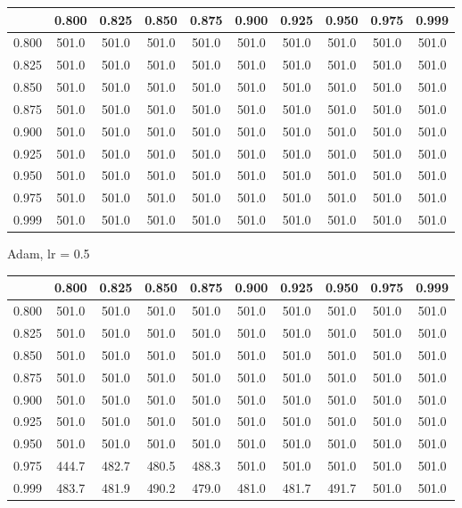 \documentclass[a4paper,14pt,oneside,openany]{memoir}
\begin{document}
	\begin{tabular}{|c|c|c|c|c|c|c|c|c|c|}
	\hline 
	 &0.800 &0.825 &0.850 &0.875 &0.900 &0.925 &0.950 &0.975 &0.999 \\
	 \hline 
	0.800 &501.0 &501.0 &501.0 &501.0 &501.0 &501.0 &501.0 &501.0 &501.0 \\
	 \hline 
	0.825 &501.0 &501.0 &501.0 &501.0 &501.0 &501.0 &501.0 &501.0 &501.0 \\
	 \hline 
	0.850 &501.0 &501.0 &501.0 &501.0 &501.0 &501.0 &501.0 &501.0 &501.0 \\
	 \hline 
	0.875 &501.0 &501.0 &501.0 &501.0 &501.0 &501.0 &501.0 &501.0 &501.0 \\
	 \hline 
	0.900 &501.0 &501.0 &501.0 &501.0 &501.0 &501.0 &501.0 &501.0 &501.0 \\
	 \hline 
	0.925 &501.0 &501.0 &501.0 &501.0 &501.0 &501.0 &501.0 &501.0 &501.0 \\
	 \hline 
	0.950 &501.0 &501.0 &501.0 &501.0 &501.0 &501.0 &501.0 &501.0 &501.0 \\
	 \hline 
	0.975 &501.0 &501.0 &501.0 &501.0 &501.0 &501.0 &501.0 &501.0 &501.0 \\
	 \hline 
	0.999 &501.0 &501.0 &501.0 &501.0 &501.0 &501.0 &501.0 &501.0 &501.0 \\
	 \hline 
	
	\end{tabular}
	
	Adam, lr = 0.5 
	
	\begin{tabular}{|c|c|c|c|c|c|c|c|c|c|}
	\hline 
	 &0.800 &0.825 &0.850 &0.875 &0.900 &0.925 &0.950 &0.975 &0.999 \\
	 \hline 
	0.800 &501.0 &501.0 &501.0 &501.0 &501.0 &501.0 &501.0 &501.0 &501.0 \\
	 \hline 
	0.825 &501.0 &501.0 &501.0 &501.0 &501.0 &501.0 &501.0 &501.0 &501.0 \\
	 \hline 
	0.850 &501.0 &501.0 &501.0 &501.0 &501.0 &501.0 &501.0 &501.0 &501.0 \\
	 \hline 
	0.875 &501.0 &501.0 &501.0 &501.0 &501.0 &501.0 &501.0 &501.0 &501.0 \\
	 \hline 
	0.900 &501.0 &501.0 &501.0 &501.0 &501.0 &501.0 &501.0 &501.0 &501.0 \\
	 \hline 
	0.925 &501.0 &501.0 &501.0 &501.0 &501.0 &501.0 &501.0 &501.0 &501.0 \\
	 \hline 
	0.950 &501.0 &501.0 &501.0 &501.0 &501.0 &501.0 &501.0 &501.0 &501.0 \\
	 \hline 
	0.975 &444.7 &482.7 &480.5 &488.3 &501.0 &501.0 &501.0 &501.0 &501.0 \\
	 \hline 
	0.999 &483.7 &481.9 &490.2 &479.0 &481.0 &481.7 &491.7 &501.0 &501.0 \\
	 \hline 
	
	\end{tabular}
	
\end{document}
